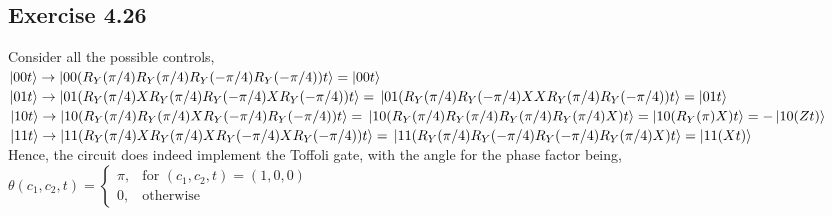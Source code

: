 \documentclass[a4paper,12pt]{article}
\begin{document}
\subsection*{Exercise 4.26}
Consider all the possible controls,\\
$\ket{00t}\rightarrow\ket{00(R_Y(\pi/4)R_Y(\pi/4)R_Y(-\pi/4)R_Y(-\pi/4))t}=\ket{00t}$\\
$\ket{01t}\rightarrow\ket{01(R_Y(\pi/4)XR_Y(\pi/4)R_Y(-\pi/4)XR_Y(-\pi/4))t}=\\
\ket{01(R_Y(\pi/4)R_Y(-\pi/4)XXR_Y(\pi/4)R_Y(-\pi/4))t}=\ket{01t}$\\
$\ket{10t}\rightarrow\ket{10(R_Y(\pi/4)R_Y(\pi/4)XR_Y(-\pi/4)R_Y(-\pi/4))t}=\\
\ket{10(R_Y(\pi/4)R_Y(\pi/4)R_Y(\pi/4)R_Y(\pi/4)X)t}=
\ket{10(R_Y(\pi)X)t}=-\ket{10(Zt)}$\\
$\ket{11t}\rightarrow\ket{11(R_Y(\pi/4)XR_Y(\pi/4)XR_Y(-\pi/4)XR_Y(-\pi/4))t}=\\
\ket{11(R_Y(\pi/4)R_Y(-\pi/4)R_Y(-\pi/4)R_Y(\pi/4)X)t}=\ket{11(Xt)}$\\
Hence, the circuit does indeed implement the Toffoli gate, with the angle for the phase factor being,\\
$\theta(c_1,c_2,t)=\begin{cases}
    \pi,&\text{for } (c_1,c_2,t)=(1,0,0)\\
    0, &\text{otherwise}
\end{cases}$
\end{document}
